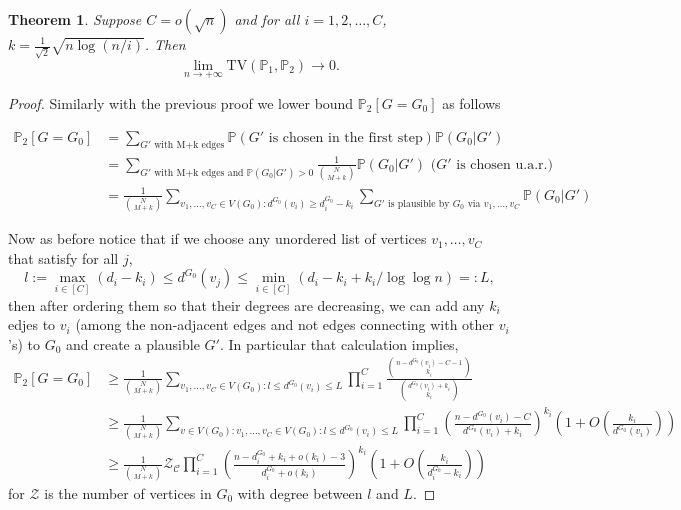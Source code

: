 \documentclass[12pt,a4paper]{article}
\newtheorem{theorem}{Theorem}[section]
\numberwithin{equation}{section}
\numberwithin{equation}{section}
\newcommand{\1}{{\text{\Large $\mathfrak 1$}}}
\newcommand{\2}[1]{{\text{\Large $\mathfrak 1$}\!\left(#1\right)}}
\begin{document}
\begin{theorem}
Suppose $C=o(\sqrt{n})$ and for all $i=1,2,\ldots,C$, $k=\frac{1}{\sqrt{2}}\sqrt{n \log (n/i)}$. Then $$ \lim_{n \rightarrow +\infty} \mathrm{TV}\left(\mathbb{P}_1,\mathbb{P}_2\right) \rightarrow 0.$$
\end{theorem}

\begin{proof}
Similarly with the previous proof we lower bound $\mathbb{P}_2[G=G_0]$ as follows

\begin{align*}
\mathbb{P}_2[G=G_0]&=\sum_{G' \text{ with M+k edges}} \mathbb{P}(G' \text{ is chosen in the first step}) \mathbb{P}(G_0|G')\\
&=\sum_{G' \text{ with M+k edges and }\mathbb{P}(G_0|G')>0 } \frac{1}{\binom{N}{M+k}} \mathbb{P}(G_0|G') \text{ ($G'$ is chosen u.a.r.)}\\
&= \frac{1}{\binom{N}{M+k}} \sum_{v_1,\ldots,v_C \in V(G_0)  : d^{G_0}(v_i)  \geq d^{G_0}_i-k_i} \sum_{G' \text{ is plausible by } G_0 \text{ via } v_1,\ldots,v_C}\mathbb{P}(G_0|G')  \end{align*}

Now as before notice that if we choose any unordered list of vertices $v_1,\ldots,v_C$ that satisfy for all $j$, $$l:=\max_{i \in [C]} \left( d_i-k_i \right) \leq d^{G_0}(v_j) \leq \min_{i \in [C]} \left(d_i-k_i+k_i/\log \log n\right)=:L,$$ then after ordering them so that their degrees are decreasing, we can add any $k_i$ edjes to $v_i$ (among the non-adjacent edges and not edges connecting with other $v_i$'s) to $G_0$ and create a plausible $G'$. In particular that calculation implies,
\begin{align*}
\mathbb{P}_2[G=G_0]& \geq  \frac{1}{\binom{N}{M+k}} \sum_{v_1,\ldots,v_C \in V(G_0)  : l \leq  d^{G_0}(v_i) \leq L }  \prod_{i=1}^C \frac{\binom{n-d^{G_0}(v_i)-C-1}{k_i}}{\binom{d^{G_0}(v_i)+k_i}{k_i}} \\
&\geq   \frac{1}{\binom{N}{M+k}} \sum_{v \in V(G_0) : v_1,\ldots,v_C \in V(G_0)  : l \leq  d^{G_0}(v_i) \leq L } \prod_{i=1}^C \left(\frac{n-d^{G_0}(v_i)-C}{d^{G_0}(v_i)+k_i}\right)^{k_i}(1+O(\frac{k_i}{d^{G_0}(v_i)}))\\
&\geq   \frac{1}{\binom{N}{M+k}} \mathcal{Z_C} \prod_{i=1}^C \left(\frac{n-d^{G_0}_i+k_i+o(k_i)-3}{d^{G_0}_i+o(k_i)}\right)^{k_i}(1+O(\frac{k_i}{d^{G_0}_i-k_i}))
\end{align*} for $\mathcal{Z}$ is the number of vertices in $G_0$ with degree between $l$ and $L$. 


\end{proof}
\end{document}
